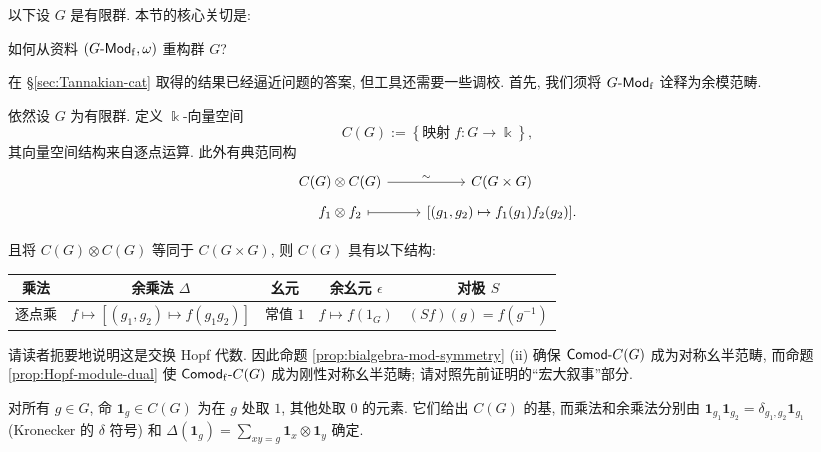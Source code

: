 以下设 $G$ 是有限群. 本节的核心关切是:
\begin{center}
	如何从资料 $\left(G\text{-}\mathsf{Mod}_{\mathrm{f}}, \omega\right)$ 重构群 $G$?
\end{center}
在 \S\ref{sec:Tannakian-cat} 取得的结果已经逼近问题的答案, 但工具还需要一些调校. 首先, 我们须将 $G\text{-}\mathsf{Mod}_{\mathrm{f}}$ 诠释为余模范畴.

\begin{definition}
	依然设 $G$ 为有限群. 定义 $\Bbbk$-向量空间
	\[ C(G) := \left\{\text{映射}\; f: G \to \Bbbk \right\}, \]
	其向量空间结构来自逐点运算. 此外有典范同构
	\[\begin{tikzcd}[row sep=tiny]
		C(G) \otimes C(G) \arrow[r, "\sim"] & C(G \times G) \\
		f_1 \otimes f_2 \arrow[mapsto, r] & {[(g_1, g_2) \mapsto f_1(g_1) f_2(g_2)]}.
	\end{tikzcd}\]
\end{definition}

且将 $C(G) \otimes C(G)$ 等同于 $C(G \times G)$, 则 $C(G)$ 具有以下结构:
\begin{center}\begin{tabular}{|c|c|c|c|c|} \hline
	乘法 & 余乘法 $\Delta$ & 幺元 & 余幺元 $\epsilon$ & 对极 $S$ \\ \hline
	逐点乘 & $f \mapsto \left[ (g_1, g_2) \mapsto f(g_1 g_2) \right]$ & 常值 $1$ & $f \mapsto f(1_G)$ & $(Sf)(g) = f(g^{-1})$ \\ \hline
\end{tabular}\end{center}
请读者扼要地说明这是交换 Hopf 代数. 因此命题 \ref{prop:bialgebra-mod-symmetry} (ii) 确保 $\mathsf{Comod}\text{-}C(G)$ 成为对称幺半范畴, 而命题 \ref{prop:Hopf-module-dual} 使 $\mathsf{Comod}_{\mathrm{f}}\text{-}C(G)$ 成为刚性对称幺半范畴; 请对照先前证明的``宏大叙事''部分.

对所有 $g \in G$, 命 $\mathbf{1}_g \in C(G)$ 为在 $g$ 处取 $1$, 其他处取 $0$ 的元素. 它们给出 $C(G)$ 的基, 而乘法和余乘法分别由 $\mathbf{1}_{g_1} \mathbf{1}_{g_2} = \delta_{g_1, g_2} \mathbf{1}_{g_1}$ (Kronecker 的 $\delta$ 符号) 和 $\Delta(\mathbf{1}_g) = \sum_{xy=g} \mathbf{1}_x \otimes \mathbf{1}_y$ 确定.

